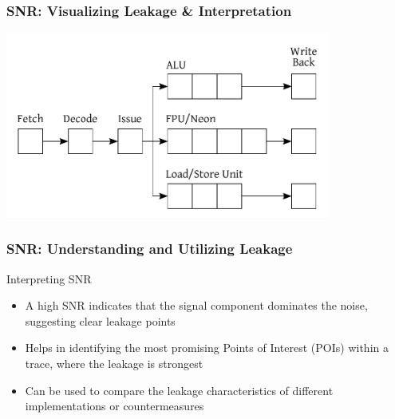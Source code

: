 \begin{frame}
    \frametitle{SNR: Visualizing Leakage \& Interpretation}
    \begin{center}
        \includegraphics[width=0.8\textwidth]{superscalar/Pictures/cortexA7.png}
    \end{center}
\end{frame}
\begin{frame}
\frametitle{SNR: Understanding and Utilizing Leakage}
    \begin{block}{Interpreting SNR}
        \begin{itemize}
            \item A high SNR indicates that the signal component dominates the noise, suggesting clear leakage points
            \item Helps in identifying the most promising Points of Interest (POIs) within a trace, where the leakage is strongest
            \item Can be used to compare the leakage characteristics of different implementations or countermeasures
        \end{itemize}
    \end{block}
\end{frame}







